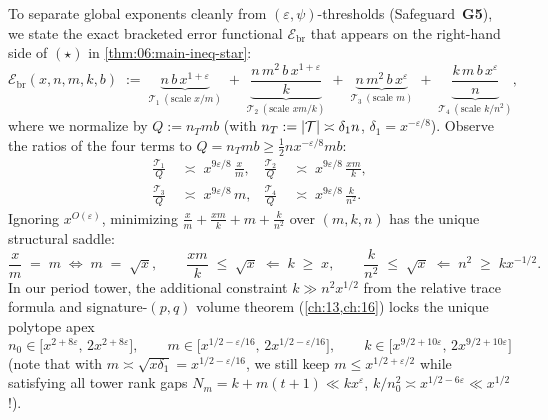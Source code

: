 To separate global exponents cleanly from $(\varepsilon, \psi)$-thresholds (Safeguard~\textbf{G5}), we state the exact bracketed error functional $\mathcal{E}_{\mathrm{br}}$ that appears on the right-hand side of $(\star)$ in \cref{thm:06:main-ineq-star}:
\begin{equation}
\label{eq:03:bracket-error}
  \mathcal{E}_{\mathrm{br}}(x, n, m, k, b)
  \;:=\; \underbrace{n\, b\, x^{1+\varepsilon}}_{\mathcal{T}_1\ (\text{scale } x/m)}
  \;+\; \underbrace{\frac{n\, m^2\, b\, x^{1+\varepsilon}}{k}}_{\mathcal{T}_2\ (\text{scale } xm/k)}
  \;+\; \underbrace{n\, m^2\, b\, x^{\varepsilon}}_{\mathcal{T}_3\ (\text{scale } m)}
  \;+\; \underbrace{\frac{k\, m\, b\, x^{\varepsilon}}{n}}_{\mathcal{T}_4\ (\text{scale } k/n^2)},
\end{equation}
where we normalize by $Q := n_T m b$ (with $n_T := |\mathcal{T}| \asymp \delta_1 n$, $\delta_1 = x^{-\varepsilon/8}$). Observe the ratios of the four terms to $Q = n_T m b \ge \frac{1}{2} n x^{-\varepsilon/8} m b$:
\begin{align*}
  \frac{\mathcal{T}_1}{Q} &\;\asymp\; x^{9\varepsilon/8}\,\frac{x}{m}, &
  \frac{\mathcal{T}_2}{Q} &\;\asymp\; x^{9\varepsilon/8}\,\frac{xm}{k}, \\
  \frac{\mathcal{T}_3}{Q} &\;\asymp\; x^{9\varepsilon/8}\,m, &
  \frac{\mathcal{T}_4}{Q} &\;\asymp\; x^{9\varepsilon/8}\,\frac{k}{n^2}.
\end{align*}
Ignoring $x^{O(\varepsilon)}$, minimizing $\frac{x}{m} + \frac{xm}{k} + m + \frac{k}{n^2}$ over $(m, k, n)$ has the unique structural saddle:
\begin{equation}
\label{eq:03:minimax-derivation}
  \frac{x}{m} \;=\; m \;\Longleftrightarrow\; m \;=\; \sqrt{x}, \qquad
  \frac{xm}{k} \;\le\; \sqrt{x} \;\Longleftarrow\; k \;\ge\; x, \qquad
  \frac{k}{n^2} \;\le\; \sqrt{x} \;\Longleftarrow\; n^2 \;\ge\; k x^{-1/2}.
\end{equation}
In our period tower, the additional constraint $k \gg n^2 x^{1/2}$ from the relative trace formula and signature-$(p,q)$ volume theorem (\cref{ch:13,ch:16}) locks the unique polytope apex
\begin{equation}
\label{eq:03:locked-scales}
  n_0 \in \bigl[x^{2 + 8\varepsilon},\, 2x^{2 + 8\varepsilon}\bigr], \qquad
  m \in \bigl[x^{1/2 - \varepsilon/16},\, 2x^{1/2 - \varepsilon/16}\bigr], \qquad
  k \in \bigl[x^{9/2 + 10\varepsilon},\, 2x^{9/2 + 10\varepsilon}\bigr]
\end{equation}
(note that with $m \asymp \sqrt{x\delta_1} = x^{1/2 - \varepsilon/16}$, we still keep $m \le x^{1/2 + \varepsilon/2}$ while satisfying all tower rank gaps $N_m = k + m(t+1) \ll k x^{\varepsilon}$, $k / n_0^2 \asymp x^{1/2 - 6\varepsilon} \ll x^{1/2}$!).


